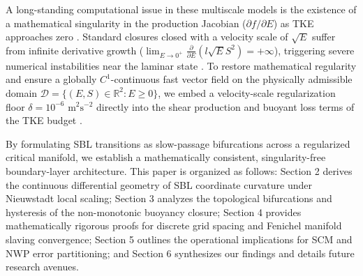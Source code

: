 A long-standing computational issue in these multiscale models is the existence of a mathematical singularity in the production Jacobian ($\partial f / \partial E$) as TKE approaches zero \cite{CoreMathRevisions}. Standard closures closed with a velocity scale of $\sqrt{E}$ suffer from infinite derivative growth ($\lim_{E \to 0^+} \frac{\partial}{\partial E}(l\sqrt{E}S^2) = +\infty$), triggering severe numerical instabilities near the laminar state \cite{CoreMathRevisions}. To restore mathematical regularity and ensure a globally $C^1$-continuous fast vector field on the physically admissible domain $\mathcal{D} = \{ (E, S) \in \mathbb{R}^2 : E \ge 0 \}$, we embed a velocity-scale regularization floor $\delta = 10^{-6}\text{ m}^2\text{s}^{-2}$ directly into the shear production and buoyant loss terms of the TKE budget \cite{BelowFastSlow, CoreMathRevisions}.

By formulating SBL transitions as slow-passage bifurcations across a regularized critical manifold, we establish a mathematically consistent, singularity-free boundary-layer architecture. This paper is organized as follows: Section 2 derives the continuous differential geometry of SBL coordinate curvature under Nieuwstadt local scaling; Section 3 analyzes the topological bifurcations and hysteresis of the non-monotonic buoyancy closure; Section 4 provides mathematically rigorous proofs for discrete grid spacing and Fenichel manifold slaving convergence; Section 5 outlines the operational implications for SCM and NWP error partitioning; and Section 6 synthesizes our findings and details future research avenues.